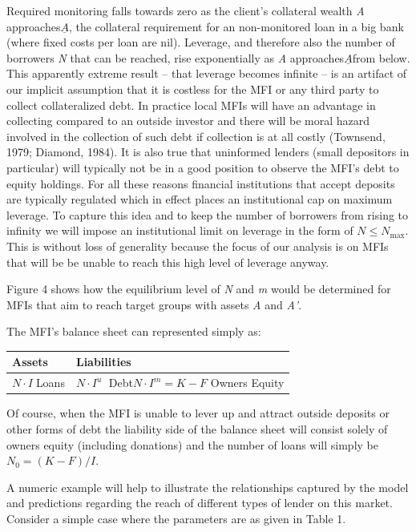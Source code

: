 \documentclass{article} %
\begin{document}
Required monitoring falls towards zero as the client's collateral wealth \textit{A} approaches$\underline{A}$, the collateral requirement for an non-monitored loan in a big bank (where fixed costs per loan are nil).  Leverage, and therefore also the number of borrowers \textit{N} that can be reached, rise exponentially as \textit{A} approaches$\underline{A}$from below. This apparently extreme result -- that leverage becomes infinite -- is an artifact of our implicit assumption that it is costless for the MFI or any third party to collect collateralized debt.  In practice local MFIs will have an advantage in collecting compared to an outside investor and there will be moral hazard involved in the collection of such debt if collection is at all costly (Townsend, 1979; Diamond, 1984).  It is also true that uninformed lenders (small depositors in particular) will typically not be in a good position to observe the MFI's debt to equity holdings. For all these reasons financial institutions that accept deposits are typically regulated which in effect places an institutional cap on maximum leverage.  To capture this idea and to keep the number of borrowers from rising to infinity we will impose an institutional limit on leverage in the form of $N\le N_{\max } .$ This is without loss of generality because the focus of our analysis is on MFIs that will be be unable to reach this high level of leverage anyway. 

Figure 4 shows how the equilibrium level of \textit{N} and \textit{m} would be determined for MFIs that aim to reach target groups with assets \textit{A} and \textit{A'}.   

The MFI's balance sheet can represented simply as:

\begin{tabular}{|p{2.1in}|p{1.6in}|} \hline 
\textbf{Assets} & \textbf{Liabilities} \\ \hline 
$N\cdot I\; $Loans & $N\cdot I^{u} \; $   Debt\newline $N\cdot I^{m} =K-F$    Owners Equity \\ \hline 
\end{tabular}



\noindent Of course, when the MFI is unable to lever up and attract outside deposits or other forms of debt the liability side of the balance sheet will consist solely of owners equity (including donations) and the number of loans will simply be $N_{0} =(K-F)/I$.  

A numeric example will help to illustrate the relationships captured by the model and predictions regarding the reach of different types of lender on this market. Consider a simple case where the parameters are as given in Table 1. 
\end{document}
